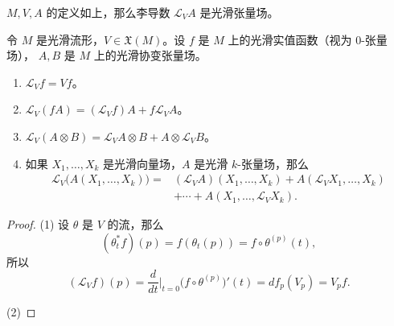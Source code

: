 \begin{lemma}
  $M,V,A$ 的定义如上，那么李导数 $\mathcal L_VA$ 是光滑张量场。
\end{lemma}

\begin{proposition}
  令 $M$ 是光滑流形，$V\in \mathfrak X(M)$。设 $f$ 是 $M$ 上的光滑实值函数（视为 $0$-张量场），
  $A,B$ 是 $M$ 上的光滑协变张量场。
  \begin{enumerate}
    \item $\mathcal L_Vf=Vf$。
    \item $\mathcal L_V(fA)=(\mathcal L_Vf)A+f\mathcal L_VA$。
    \item $\mathcal L_V(A\otimes B)=\mathcal L_VA\otimes B+A\otimes \mathcal L_VB$。
    \item 如果 $X_1,\dots,X_k$ 是光滑向量场，$A$ 是光滑 $k$-张量场，那么
    \begin{align*}
      \mathcal L_V\bigl(A(X_1,\dots,X_k)\bigr)={}&(\mathcal L_VA)(X_1,\dots,X_k)+A(\mathcal L_VX_1,\dots,X_k)\\
      &+\cdots+ A(X_1,\dots,\mathcal L_VX_k).
    \end{align*}
  \end{enumerate}
\end{proposition}
\begin{proof}
  (1) 设 $\theta$ 是 $V$ 的流，那么
  \[
    (\theta_t^*f)(p)=f(\theta_t(p))=f\circ\theta^{(p)}(t),
  \]
  所以
  \[
    (\mathcal L_Vf)(p)=\frac{d}{dt}\bigg|_{t=0}\bigl(f\circ\theta^{(p)}\bigr)'(t)
    =df_p(V_p)=V_pf.
  \]

  (2) 
\end{proof}









